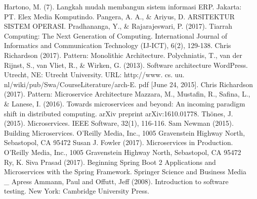 
\begin{thebibliography}{7}

{Hartono, M. (7). Langkah mudah membangun sistem informasi ERP. Jakarta: PT. Elex Media Komputindo.}
{Pangera, A. A., \& Ariyus, D. ARSITEKTUR SISTEM OPERASI.}
{Pradhananga, Y., \& Rajarajeswari, P. (2017). Tiarrah Computing: The Next Generation of Computing. International Journal of Informatics and Communication Technology (IJ-ICT), 6(2), 129-138.}
{Chris Richardson (2017). Pattern: Monolithic Architecture.}
{Polychniatis, T., van der Rijnst, S., van Vliet, R., \& Wirken, G. (2013). Software architecture WordPress. Utrecht, NE: Utrecht University. URL: http://www. cs. uu. nl/wiki/pub/Swa/CourseLiterature/arch-E. pdf [June 24, 2015].}
{Chris Richardson (2017). Pattern: Microservice Architecture}
{Mazzara, M., Mustafin, R., Safina, L., \& Lanese, I. (2016). Towards microservices and beyond: An incoming paradigm shift in distributed computing. arXiv preprint arXiv:1610.01778.}
{Thönes, J. (2015). Microservices. IEEE Software, 32(1), 116-116.}
{Sam Newman (2015). Building Microservices. O’Reilly Media, Inc., 1005 Gravenstein Highway North, Sebastopol, CA 95472}
{Susan J. Fowler (2017). Microservices in Production. O’Reilly Media, Inc., 1005 Gravenstein Highway North, Sebastopol, CA 95472}
{Ry, K. Siva Prasad (2017). Beginning Spring Boot 2 Applications and Microservices with the Spring Framework. Springer Science and Business Media \_ Apress}
{Ammann, Paul and Offutt, Jeff (2008). Introduction to software testing. New York: Cambridge University Press.}

\end{thebibliography}
